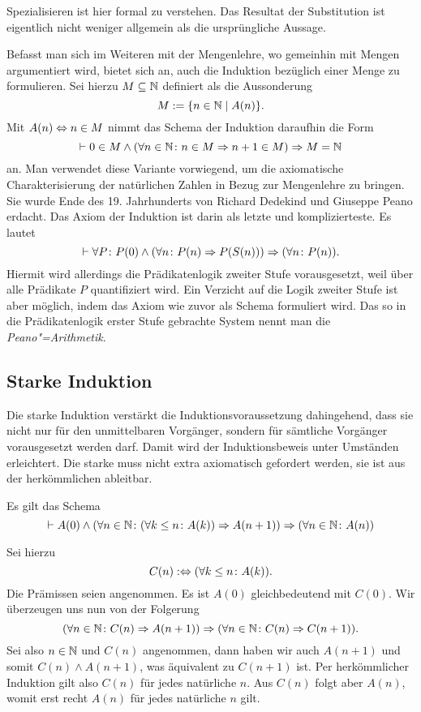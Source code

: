 \noindent
Spezialisieren ist hier formal zu verstehen. Das Resultat
der Substitution ist eigentlich nicht weniger allgemein als die
ursprüngliche Aussage.

Befasst man sich im Weiteren mit der Mengenlehre, wo gemeinhin mit
Mengen argumentiert wird, bietet sich an, auch die Induktion bezüglich
einer Menge zu formulieren. Sei hierzu $M\subseteq\mathbb N$ definiert als
die Aussonderung
\[M := \{n\in\mathbb N\mid A(n)\}.\]
Mit $A(n)\Leftrightarrow n\in M$ nimmt das Schema der Induktion daraufhin die Form
\[\vdash 0\in M\land (\forall n\in\mathbb N\colon n\in M\Rightarrow n+1\in M)\Rightarrow M = \mathbb N\]
an. Man verwendet diese Variante vorwiegend, um die axiomatische
Charakterisierung der natürlichen Zahlen in Bezug zur Mengenlehre zu
bringen. Sie wurde Ende des 19. Jahrhunderts von Richard Dedekind und
Giuseppe Peano erdacht. Das Axiom der Induktion ist darin als letzte
und komplizierteste. Es lautet
\[\vdash \forall P\colon P(0)\land (\forall n\colon P(n)\Rightarrow P(S(n)))
\Rightarrow (\forall n\colon P(n)).\]
Hiermit wird allerdings die Prädikatenlogik zweiter Stufe vorausgesetzt,
weil über alle Prädikate $P$ quantifiziert wird. Ein Verzicht auf die
Logik zweiter Stufe ist aber möglich, indem das Axiom wie zuvor als
Schema formuliert wird. Das so in die Prädikatenlogik erster Stufe gebrachte
System nennt man die \emph{Peano"=Arithmetik}.

\subsection{Starke Induktion}

Die starke Induktion verstärkt die Induktionsvoraussetzung
dahingehend, dass sie nicht nur für den unmittelbaren Vorgänger, sondern
für sämtliche Vorgänger vorausgesetzt werden darf. Damit wird der
Induktionsbeweis unter Umständen erleichtert. Die starke muss nicht
extra axiomatisch gefordert werden, sie ist aus der herkömmlichen
ableitbar.
\begin{Satz}
Es gilt das Schema
\[\vdash A(0)\land (\forall n\in\mathbb N\colon (\forall k\le n\colon A(k))\Rightarrow A(n+1))
\Rightarrow (\forall n\in\mathbb N\colon A(n))\]
\end{Satz}
\begin{Beweis}
Sei hierzu
\[C(n) :\Leftrightarrow (\forall k\le n\colon A(k)).\]
Die Prämissen seien angenommen. Es ist $A(0)$
gleichbedeutend mit $C(0)$. Wir überzeugen uns nun von der Folgerung
\[(\forall n\in\mathbb N\colon C(n)\Rightarrow A(n+1))\Rightarrow (\forall n\in \mathbb N\colon C(n)\Rightarrow C(n+1)).\]
Sei also $n\in\mathbb N$ und $C(n)$ angenommen, dann haben wir auch $A(n+1)$
und somit $C(n)\land A(n+1)$, was äquivalent zu $C(n+1)$ ist. Per
herkömmlicher Induktion gilt also $C(n)$ für jedes natürliche
$n$. Aus $C(n)$ folgt aber $A(n)$, womit erst recht $A(n)$ für jedes
natürliche $n$ gilt.\,\qedsymbol
\end{Beweis}

